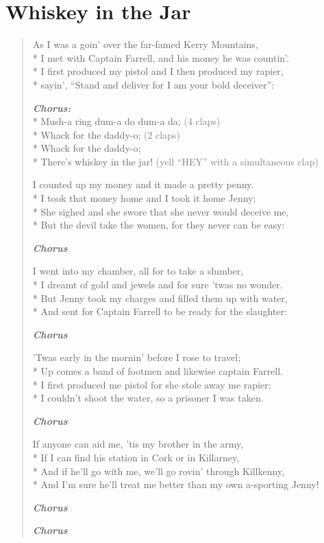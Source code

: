 \documentclass[9pt,twoside]{extarticle}
\newenvironment{xverse}{
	\begin{verse}
	\fontsize{8.5}{10.5}\selectfont
	}
	{
	\end{verse}
	\penalty 0
}
\newcommand{\chorusdef}{\textbf{\emph{Chorus:}}\\*}
\newcommand{\chorusmark}[1][1]{%
\vspace{-0.5\stanzaskip}%
\textbf{\emph{Chorus \ifthenelse{\equal{#1}{1}}{}{$\times$ #1}}}%
\vspace{-0.5\stanzaskip}%
}
\newcommand{\gray}[1]{\textcolor{gray}{#1}}
\begin{document}
\section{Whiskey in the Jar}

\begin{xverse}
As I was a goin’ over the far-famed Kerry Mountains, \\*
I met with Captain Farrell, and his money he was countin’. \\*
I first produced my pistol and I then produced my rapier, \\*
sayin’, “Stand and deliver for I am your bold deceiver”:

\chorusdef
Mush-a ring dum-a do dum-a da; \gray{(4 claps)} \\*
Whack for the daddy-o; \gray{(2 claps)} \\*
Whack for the daddy-o; \\*
There’s whiskey in the jar! \gray{(yell “HEY” with a simultaneous clap)}

I counted up my money and it made a pretty penny. \\*
I took that money home and I took it home Jenny; \\*
She sighed and she swore that she never would deceive me, \\*
But the devil take the women, for they never can be easy:

\chorusmark

I went into my chamber, all for to take a slumber, \\*
I dreamt of gold and jewels and for sure ’twas no wonder. \\*
But Jenny took my charges and filled them up with water, \\*
And sent for Captain Farrell to be ready for the slaughter:

\chorusmark

’Twas early in the mornin’ before I rose to travel; \\*
Up comes a band of footmen and likewise captain Farrell. \\*
I first produced me pistol for she stole away me rapier; \\*
I couldn’t shoot the water, so a prisoner I was taken.

\chorusmark

If anyone can aid me, ’tis my brother in the army, \\*
If I can find his station in Cork or in Killarney, \\*
And if he’ll go with me, we’ll go rovin’ through Killkenny, \\*
And I’m sure he’ll treat me better than my own a-sporting Jenny!

\chorusmark

\chorusmark
\end{xverse}
\end{document}
